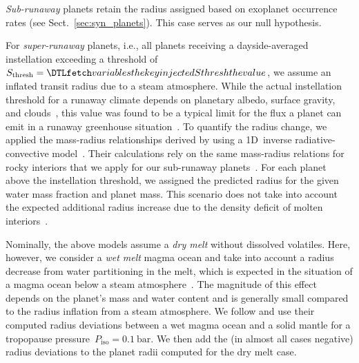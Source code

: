 \documentclass[twocolumn,twocolappendix]{aastex631}
\begin{document}
\textit{Sub-runaway} planets retain the radius assigned based on exoplanet occurrence rates (see Sect.~\ref{sec:syn_planets}).
This case serves as our null hypothesis.

For \textit{super-runaway} planets, i.e., all planets receiving a dayside-averaged instellation exceeding a threshold of $S_\mathrm{thresh} = \var{injectedSthresh}$, we assume an inflated transit radius due to a steam atmosphere.
While the actual instellation threshold for a runaway climate depends on planetary albedo, surface gravity, and clouds~\citep{2019Icar..317..583P,Turbet2021,Pierrehumbert2022}, this value was found to be a typical limit for the flux a planet can emit in a runaway greenhouse situation~\citep{Goldblatt2013,Kopparapu2013,Leconte2013,Hamano2015,2017JGRE..122.1458S,2019ApJ...875...31K,Boukrouche2021,2021JGRE..12606711L}.
To quantify the radius change, we applied the mass-radius relationships derived by \citet{Turbet2020} using a 1D~inverse radiative-convective model~\citep{Turbet2019}.
Their calculations rely on the same mass-radius relations for rocky interiors that we apply for our sub-runaway planets~\citep{Zeng2016}.
For each planet above the instellation threshold, we assigned the predicted radius for the given water mass fraction and planet mass.
This scenario does not take into account the expected additional radius increase due to the density deficit of molten interiors~\citep{Bower2019}. 

Nominally, the above models assume a \textit{dry melt} without dissolved volatiles.
Here, however, we consider a \textit{wet melt} magma ocean and take into account a radius decrease from water partitioning in the melt, which is expected in the situation of a magma ocean below a steam atmosphere~\citep{Dorn2021}.
The magnitude of this effect depends on the planet's mass and water content and is generally small compared to the radius inflation from a steam atmosphere.
We follow \citet{Dorn2021} and use their computed radius deviations between a wet magma ocean and a solid mantle for a tropopause pressure~$P_\mathrm{iso}=\SI{0.1}{\bar}$.
We then add the (in almost all cases negative) radius deviations to the planet radii computed for the dry melt case.
\end{document}
